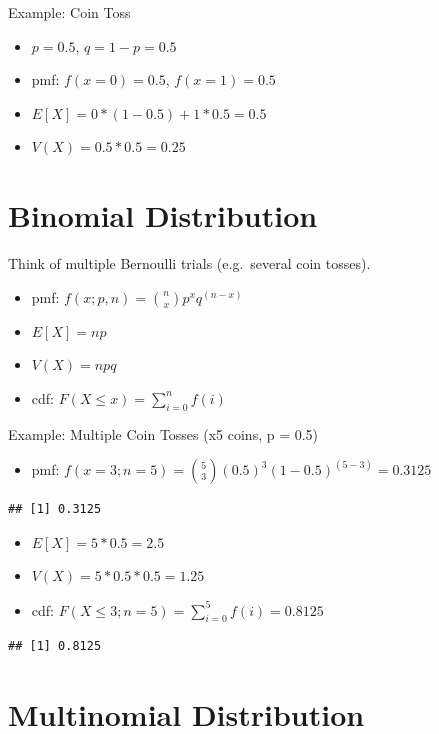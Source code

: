 \documentclass[]{book}
\providecommand{\tightlist}{%
  \setlength{\itemsep}{0pt}\setlength{\parskip}{0pt}}
\theoremstyle{definition}
\theoremstyle{definition}
\theoremstyle{definition}
\theoremstyle{remark}
\begin{document}
Example: Coin Toss

\begin{itemize}
\item
  \(p = 0.5\), \(q = 1 - p = 0.5\)
\item
  pmf: \(f(x = 0) = 0.5\), \(f(x = 1) = 0.5\)
\item
  \(E[X] = 0*(1-0.5) + 1*0.5 = 0.5\)
\item
  \(V(X) = 0.5*0.5 = 0.25\)
\end{itemize}

\hypertarget{binomial-distribution}{%
\section{Binomial Distribution}\label{binomial-distribution}}

Think of multiple Bernoulli trials (e.g.~several coin tosses).

\begin{itemize}
\item
  pmf: \(f(x;p,n) = \binom{n}{x} p^xq^{(n-x)}\)
\item
  \(E[X] = np\)
\item
  \(V(X) = npq\)
\item
  cdf: \(F(X \le x) = \sum_{i=0}^n f(i)\)
\end{itemize}

Example: Multiple Coin Tosses (x5 coins, p = 0.5)

\begin{itemize}
\tightlist
\item
  pmf: \(f(x=3;n=5) = \binom{5}{3} (0.5)^3(1-0.5)^{(5-3)} = 0.3125\)
\end{itemize}

\begin{verbatim}
## [1] 0.3125
\end{verbatim}

\begin{itemize}
\item
  \(E[X] = 5*0.5 = 2.5\)
\item
  \(V(X) = 5*0.5*0.5 = 1.25\)
\item
  cdf: \(F(X \le 3;n=5) = \sum_{i=0}^5 f(i) = 0.8125\)
\end{itemize}

\begin{verbatim}
## [1] 0.8125
\end{verbatim}

\hypertarget{multinomial-distribution}{%
\section{Multinomial Distribution}\label{multinomial-distribution}}
\end{document}
